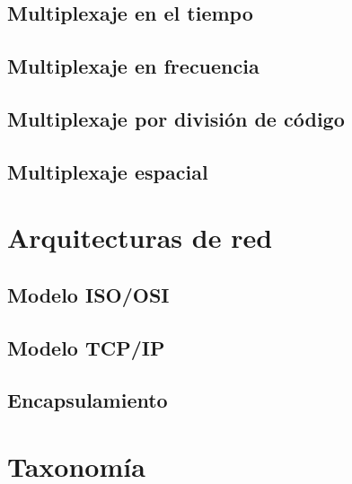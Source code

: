 \documentclass[
]{book}
\begin{document}
\hypertarget{multiplexaje-en-el-tiempo}{%
\subsection{Multiplexaje en el tiempo}\label{multiplexaje-en-el-tiempo}}

\hypertarget{multiplexaje-en-frecuencia}{%
\subsection{Multiplexaje en frecuencia}\label{multiplexaje-en-frecuencia}}

\hypertarget{multiplexaje-por-divisiuxf3n-de-cuxf3digo}{%
\subsection{Multiplexaje por división de código}\label{multiplexaje-por-divisiuxf3n-de-cuxf3digo}}

\hypertarget{multiplexaje-espacial}{%
\subsection{Multiplexaje espacial}\label{multiplexaje-espacial}}

\hypertarget{arquitecturas-de-red}{%
\section{Arquitecturas de red}\label{arquitecturas-de-red}}

\hypertarget{modelo-isoosi}{%
\subsection{Modelo ISO/OSI}\label{modelo-isoosi}}

\hypertarget{modelo-tcpip}{%
\subsection{Modelo TCP/IP}\label{modelo-tcpip}}

\hypertarget{encapsulamiento}{%
\subsection{Encapsulamiento}\label{encapsulamiento}}

\hypertarget{taxonomuxeda}{%
\section{Taxonomía}\label{taxonomuxeda}}
\end{document}
